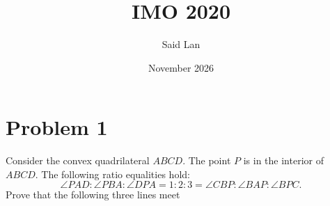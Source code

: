 \documentclass{article}
\title{IMO 2020}
\author{Said Lan}
\date{November 2026}
\begin{document}
\maketitle

\section{Problem 1}

{\large Consider the convex quadrilateral \(ABCD\). The point \(P\) is 
in the interior of \(ABCD\). The following ratio equalities hold: 
\[\angle PAD : \angle PBA : \angle DPA = 1 : 2 : 3 = \angle CBP : \angle BAP : \angle BPC.\]
Prove that the following three lines meet 
}
\end{document}
